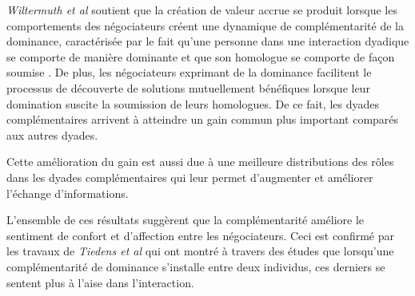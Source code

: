 	\emph{Wiltermuth et al} soutient que la création de valeur accrue se produit lorsque les comportements des négociateurs créent une dynamique de complémentarité de la dominance, caractérisée par le fait qu'une personne dans une interaction dyadique se comporte de manière dominante et que son homologue se comporte de façon soumise \cite{wiltermuth2015benefits}. De plus, les négociateurs exprimant de la dominance facilitent le processus de découverte de solutions mutuellement bénéfiques lorsque leur domination suscite la soumission de leurs homologues. De ce fait, les dyades complémentaires arrivent à atteindre un gain commun plus important comparés aux autres dyades.
	
	Cette amélioration du gain est aussi due à une meilleure distributions des rôles dans les dyades complémentaires qui leur permet d'augmenter et améliorer l'échange d'informations. 
	
	L'ensemble de ces résultats suggèrent que la complémentarité améliore le sentiment de confort et d'affection entre les négociateurs. Ceci est confirmé par les travaux de \emph{Tiedens et al} \cite{tiedens2003power} qui ont montré à travers des études que lorsqu'une complémentarité de dominance s'installe entre deux individus, ces derniers se sentent plus à l'aise dans l'interaction. 
	
	
	


